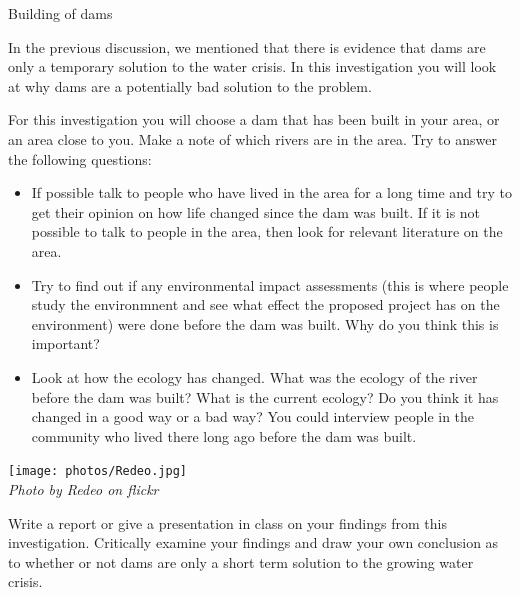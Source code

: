 \par 
\label{m38138*id0123}
            \begin{Investigation}{Building of dams}
            \nopagebreak

\label{m38138*id0128031}In the previous discussion, we mentioned that there is evidence that dams are only a temporary solution to the water crisis. In this investigation you will look at why dams are a potentially bad solution to the problem. 
\par 
\label{m38138*id473692}For this investigation you will choose a dam that has been built in your area, or an area close to you. Make a note of which rivers are in the area. Try to answer the following questions: \\
\begin{minipage}{.7\textwidth}
\label{m38138*id774}\begin{itemize}[noitemsep]
            \label{m38138*id034582}\item If possible talk to people who have lived in the area for a long time and try to get their opinion on how life changed since the dam was built. If it is not possible to talk to people in the area, then look for relevant literature on the area.
\label{m38138*id08323}\item Try to find out if any environmental impact assessments (this is where people study the environmnent and see what effect the proposed project has on the environment) were done before the dam was built. Why do you think this is important? 
\label{m38138*id0832346}\item 
Look at how the ecology has changed. What was the ecology of the river before the dam was built? What is the current ecology? Do you think it has changed in a good way or a bad way? You could interview people in the community who lived there long ago before the dam was built.
\end{itemize}
        \par 
\end{minipage}
\begin{minipage}{.3\textwidth}
 \begin{center}
  \texttt{[image: photos/Redeo.jpg]} \\
\textsl{Photo by Redeo on flickr}
 \end{center}

\end{minipage}
\label{m38138*id08322432}
Write a report or give a presentation in class on your findings from this investigation. Critically examine your findings and draw your own conclusion as to whether or not dams are only a short term solution to the growing water crisis.

\par \end{Investigation}
